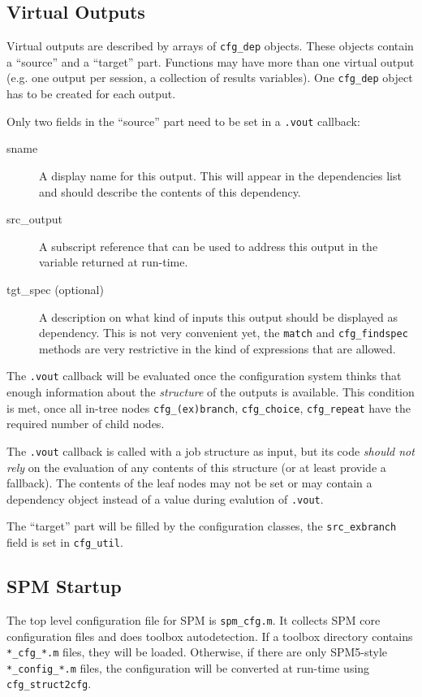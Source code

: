 \documentclass[a4paper]{book}
\begin{document}
\subsection{Virtual Outputs}

Virtual outputs are described by arrays of \verb|cfg_dep| objects. These
objects contain a ``source'' and a ``target'' part. Functions may have more
than one virtual output (e.g. one output per session, a collection of results
variables). One \verb|cfg_dep| object has to be created for each output.

Only two fields in the ``source'' part need to be set in a \verb|.vout|
callback: 
\begin{description}
\item[sname] A display name for this output. This will appear in the
  dependencies list and should describe the contents of this dependency.
\item[src\_output] A subscript reference that can be used to address this
  output in the variable returned at run-time.
\item[tgt\_spec (optional)] A description on what kind of inputs this output
  should be displayed as dependency. This is not very convenient yet, the
  \verb|match| and \verb|cfg_findspec| methods are very restrictive in the
  kind of expressions that are allowed.
\end{description}

The \verb|.vout| callback will be evaluated once the configuration system
thinks that enough information about the \emph{structure} of the outputs is
available. This condition is met, once all in-tree nodes
\verb|cfg_(ex)branch|, \verb|cfg_choice|, \verb|cfg_repeat| have the required
number of child nodes. 

The \verb|.vout| callback is called with a job structure as input, but its
code \emph{should not rely} on the evaluation of any contents of this
structure (or at least provide a fallback). The contents of the leaf nodes may
not be set or may contain a dependency object instead of a value during
evalution of \verb|.vout|.

The ``target'' part will be filled by the configuration classes, the
\verb|src_exbranch| field is set in \verb|cfg_util|.

\subsection{SPM Startup}

The top level configuration file for SPM is \verb|spm_cfg.m|. It collects SPM
core configuration files and does toolbox autodetection. If a toolbox
directory contains \verb|*_cfg_*.m| files, they will be loaded. Otherwise, if
there are only SPM5-style \verb|*_config_*.m| files, the configuration will be
converted at run-time using \verb|cfg_struct2cfg|.
\end{document}
